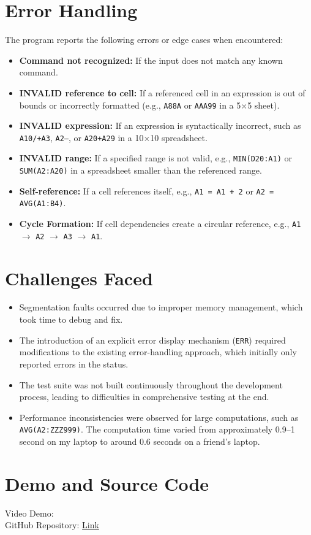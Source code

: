 \documentclass{article}
\begin{document}
\section{Error Handling}
The program reports the following errors or edge cases when encountered:
\begin{itemize}
    \item \textbf{Command not recognized:} If the input does not match any known command.
    \item \textbf{INVALID reference to cell:} If a referenced cell in an expression is out of bounds or incorrectly formatted (e.g., \texttt{A88A} or \texttt{AAA99} in a 5×5 sheet).
    \item \textbf{INVALID expression:} If an expression is syntactically incorrect, such as \texttt{A10/+A3}, \texttt{A2--}, or \texttt{A20+A29} in a 10×10 spreadsheet.
    \item \textbf{INVALID range:} If a specified range is not valid, e.g., \texttt{MIN(D20:A1)} or \texttt{SUM(A2:A20)} in a spreadsheet smaller than the referenced range.
    \item \textbf{Self-reference:} If a cell references itself, e.g., \texttt{A1 = A1 + 2} or \texttt{A2 = AVG(A1:B4)}.
    \item \textbf{Cycle Formation:} If cell dependencies create a circular reference, e.g., \texttt{A1} $\rightarrow$ \texttt{A2} $\rightarrow$ \texttt{A3} $\rightarrow$ \texttt{A1}.
\end{itemize}

\section{Challenges Faced}
\begin{itemize}
    \item Segmentation faults occurred due to improper memory management, which took time to debug and fix.
    \item The introduction of an explicit error display mechanism (\texttt{ERR}) required modifications to the existing error-handling approach, which initially only reported errors in the status.
    \item The test suite was not built continuously throughout the development process, leading to difficulties in comprehensive testing at the end.
    \item Performance inconsistencies were observed for large computations, such as \texttt{AVG(A2:ZZZ999)}. The computation time varied from approximately 0.9–1 second on my laptop to around 0.6 seconds on a friend's laptop.
\end{itemize}

\section{Demo and Source Code}
Video Demo: \href{your-demo-link}{}\\
GitHub Repository: \href{https://github.com/dheeraj-hj/Spreadsheet-Program-in-C}{Link}
\end{document}
